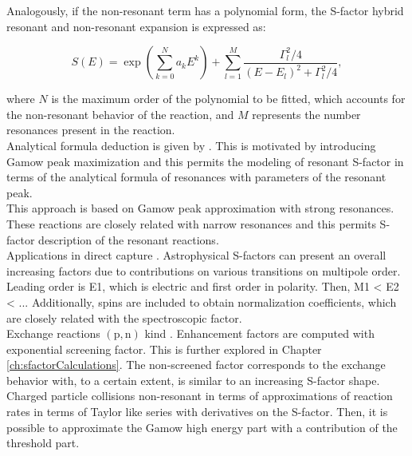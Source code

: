 \documentclass[openany]{book}
\begin{document}
Analogously, if the non-resonant term has a polynomial form, the S-factor hybrid resonant and non-resonant expansion is expressed as:

\begin{equation}  \label{eq:empirical_hybridExponential}
	S(E) =  \exp { \left( \sum _{k = 0}^{N} {a_kE^k} \right) } + \sum_{l = 1}^{M} {\frac{\Gamma_l^2/4}{(E - E_l)^2 + \Gamma_l^2/4}},
\end{equation}

where $N$ is the maximum order of the polynomial to be fitted, which accounts for the non-resonant behavior of the reaction, and $M$ represents the number resonances present in the reaction.  \\

Analytical formula deduction is given by \cite{kimura_bonasera_2013}. This is motivated by introducing Gamow peak maximization and this permits the modeling of resonant S-factor in terms of the analytical formula of resonances with parameters of the resonant peak. \\

This approach is based on Gamow peak approximation with strong resonances. These reactions are closely related with narrow resonances and this permits S-factor description of the resonant reactions.   \\

Applications in direct capture \cite{jennings_karataglidis_shoppa_1998}. Astrophysical S-factors can present an overall increasing factors due to contributions on various transitions on multipole order.  Leading order is E1, which is electric and first order in polarity. Then, M1 < E2 < ...  Additionally, spins are included to obtain normalization coefficients, which are closely related with the spectroscopic factor. \\

 Exchange reactions $\mathrm{(p, n)}$ kind \cite{hussein_abdullah_2020}. Enhancement factors are computed with exponential screening factor. This is further explored in Chapter \ref{ch:sfactorCalculations}. The non-screened factor corresponds to the exchange behavior with, to a certain extent, is similar to an increasing S-factor shape. \\

Charged particle collisions non-resonant \cite{ueda_sargeant_pato_hussein_2002} in terms of approximations of reaction rates in terms of Taylor like series with derivatives on the S-factor.  Then, it is possible to approximate the Gamow high energy part with a contribution of the threshold part.  \\
\end{document}
